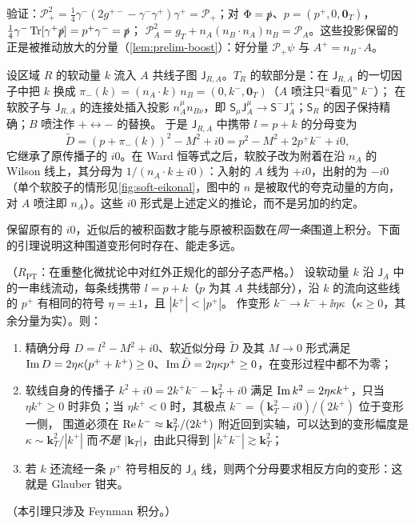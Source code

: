 验证：$\mathcal P_+^2=\frac14\gamma^-(2g^{+-}-\gamma^-\gamma^+)\gamma^+=\mathcal P_+$；对 $\Phi=\slashed{p}$、$p=(p^+,0,\mathbf 0_T)$，$\frac14\gamma^-\operatorname{Tr}[\gamma^+\slashed{p}]=p^+\gamma^-=\slashed{p}$；
$\mathcal P_A^2=g_T+n_A(n_B\cdot n_A)n_B=\mathcal P_A$。这些投影保留的正是被推动放大的分量（\cref{lem:prelim-boost}）：好分量 $\mathcal P_+\psi$ 与 $A^+=n_B\cdot A$。

\begin{definition}\label{def:method-soft-approx}
设区域 $R$ 的软动量 $k$ 流入 $A$ 共线子图 $\mathsf J_{R,A}$。$T_R$ 的软部分是：在 $\mathsf J_{R,A}$ 的一切因子中把 $k$ 换成 $\pi_-(k)=(n_A\cdot k)\,n_B=(0,k^-,\mathbf 0_T)$（$A$ 喷注只“看见” $k^-$）；
在软胶子与 $\mathsf J_{R,A}$ 的连接处插入投影 $n_A^\mu n_{B\nu}$，即 $\mathsf S_\mu\mathsf J_A^\mu\to\mathsf S^-\mathsf J_A^+$；$\mathsf S_R$ 的因子保持精确；$B$ 喷注作 $+\leftrightarrow-$ 的替换。
于是 $\mathsf J_{R,A}$ 中携带 $l=p+k$ 的分母变为
\begin{equation}\label{eq:method-Dtilde}
\tilde D=(p+\pi_-(k))^2-M^2+i0=p^2-M^2+2p^+k^-+i0 ,
\end{equation}
它继承了原传播子的 $i0$。在 Ward 恒等式之后，软胶子改为附着在沿 $n_A$ 的 Wilson 线上，其分母为 $1/(n_A\cdot k\pm i0)$：入射的 $A$ 线为 $+i0$，出射的为 $-i0$
（单个软胶子的情形见\cref{fig:soft-eikonal}，图中的 $n$ 是被取代的夸克动量的方向，对 $A$ 喷注即 $n_A$）。这些 $i0$ 形式是上述定义的推论，而不是另加的约定。%
\end{definition}

保留原有的 $i0$，近似后的被积函数才能与原被积函数在\emph{同一条}围道上积分。下面的引理说明这种围道变形何时存在、能走多远。

\begin{lemma}\label{lem:method-i0-compat}
（$R_{\mathrm{PT}}$：在重整化微扰论中对红外正规化的部分子态严格。）
设软动量 $k$ 沿 $\mathsf J_A$ 中的一串线流动，每条线携带 $l=p+k$（$p$ 为其 $A$ 共线部分），沿 $k$ 的流向这些线的 $p^+$ 有相同的符号 $\eta=\pm1$，且 $|k^+|<|p^+|$。
作变形 $k^-\to k^-+\ii\eta\kappa$（$\kappa\ge0$，其余分量为实）。则：
\begin{enumerate}[label=(\alph*),leftmargin=2em,itemsep=1pt,topsep=2pt]
\item 精确分母 $D=l^2-M^2+i0$、软近似分母 $\tilde D$ 及其 $M\to0$ 形式满足 $\operatorname{Im} D=2\eta\kappa(p^++k^+)\ge0$、$\operatorname{Im}\tilde D=2\eta\kappa p^+\ge0$，在变形过程中都不为零；
\item 软线自身的传播子 $k^2+i0=2k^+k^--\mathbf k_T^2+i0$ 满足 $\operatorname{Im} k^2=2\eta\kappa k^+$，只当 $\eta k^+\ge0$ 时非负；当 $\eta k^+<0$ 时，其极点 $k^-=(\mathbf k_T^2-i0)/(2k^+)$ 位于变形一侧，
  围道必须在 $\operatorname{Re} k^-\approx\mathbf k_T^2/(2k^+)$ 附近回到实轴，可以达到的变形幅度是 $\kappa\sim\mathbf k_T^2/|k^+|$ 而\emph{不是} $|\mathbf k_T|$，由此只得到 $|k^+k^-|\gtrsim\mathbf k_T^2$；
\item 若 $k$ 还流经一条 $p^+$ 符号相反的 $\mathsf J_A$ 线，则两个分母要求相反方向的变形：这就是 Glauber 钳夹。
\end{enumerate}
（本引理只涉及 Feynman 积分。）
\end{lemma}

